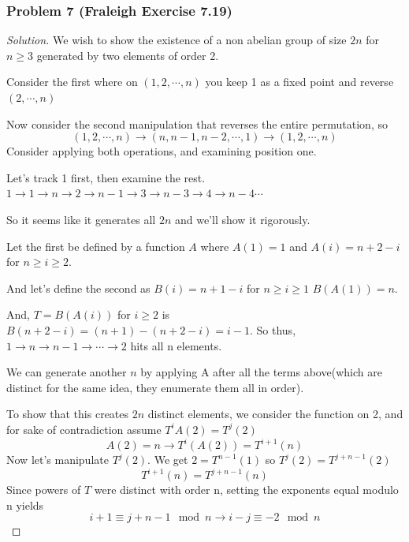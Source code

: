 \documentclass[11pt]{article}
\newcommand{\1}{\mathbf{1}}
\theoremstyle{definition}
\newenvironment{solution}{\begin{proof}[Solution]}{\end{proof}}
\begin{document}
\subsubsection*{Problem 7 (Fraleigh Exercise 7.19)}
\begin{solution}
    We wish to show the existence of a non abelian group of size $2n$ for $n \ge 3$
    generated by two elements of order 2.

\par    Consider the first where on $(1, 2, \cdots, n)$ you keep 1 as a fixed point
and reverse $(2, \cdots, n)$
    \par Now consider the second manipulation that reverses the entire permutation, so $$(1, 2, \cdots, n) \rightarrow (n, n-1, n-2, \cdots, 1) \rightarrow (1, 2,\cdots, n)$$
    Consider applying both operations, and examining position one.
\par    Let's track 1 first, then examine the rest. $ 1\rightarrow 1 \rightarrow n \rightarrow 2 \rightarrow n - 1 \rightarrow 3 \rightarrow n - 3 \rightarrow 4 \rightarrow n - 4 \cdots $
\par So it seems like it generates all $2n$ and we'll show it rigorously.
\par Let the first be defined by a function $A$ where $A(1) = 1$ and $A(i) = n + 2 - i$ for
$n \ge i \ge 2.$
\par And let's define the second as $B(i) = n + 1 - i$ for $n \ge i \ge 1$
$B(A(1)) = n.$
\par And, $T = B(A(i))$ for $i \ge 2$ is $B(n + 2 - i) = (n + 1) - (n + 2 - i) = i - 1.$
So thus, $1 \rightarrow n \rightarrow n - 1\rightarrow \cdots \rightarrow 2$ hits all n
elements.
\par We can generate another $n$ by applying A after all the terms above(which are
distinct for the same idea, they enumerate them all in order).
\par To show that this creates $2n$ distinct elements, we consider the function on 2,
and for sake of contradiction assume $T^{i} A(2) = T^{j} (2)$
$$A(2) = n\rightarrow T^i (A(2)) = T^{i+1}(n)$$
Now let's manipulate $T^j(2).$ We get $2 = T^{n-1}(1)$ so $T^j(2) = T^{j + n - 1}(2) $
$$T^{i+1}(n) = T^{j + n - 1}(n)$$
   Since powers of $T$ were distinct with order n, setting the exponents equal modulo n
   yields $$i + 1 \equiv j + n - 1 \mod n \rightarrow i - j \equiv -2 \mod n$$


\end{solution}
\end{document}
